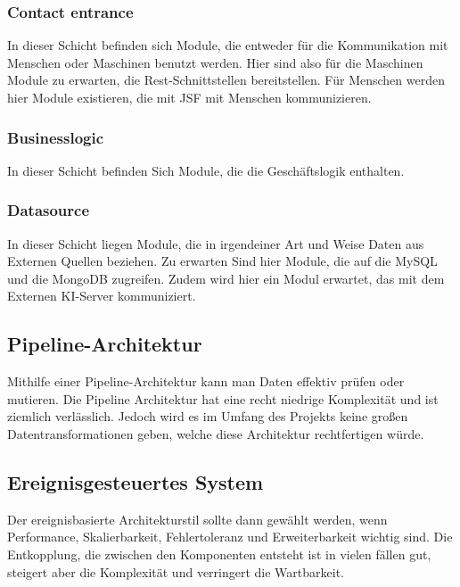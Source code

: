 \vspace{12pt}

\subsubsection{Contact entrance}
In dieser Schicht befinden sich Module, die entweder für die Kommunikation mit Menschen oder Maschinen benutzt werden. Hier sind also für die Maschinen Module zu erwarten, die Rest-Schnittstellen bereitstellen. Für Menschen werden hier Module existieren, die mit JSF mit Menschen kommunizieren. 

\vspace{12pt}

\subsubsection{Businesslogic}
In dieser Schicht befinden Sich Module, die die Geschäftslogik enthalten. 

\vspace{12pt}

\subsubsection{Datasource}
In dieser Schicht liegen Module, die in irgendeiner Art und Weise Daten aus Externen Quellen beziehen. Zu erwarten Sind hier Module, die auf die MySQL und die MongoDB zugreifen. Zudem wird hier ein Modul erwartet, das mit dem Externen KI-Server kommuniziert. 

\vspace{18pt}

\subsection{Pipeline-Architektur}
Mithilfe einer Pipeline-Architektur kann man Daten effektiv prüfen oder mutieren.  
Die Pipeline Architektur hat eine recht niedrige Komplexität und ist ziemlich verlässlich.  
Jedoch wird es im Umfang des Projekts keine großen Datentransformationen geben, welche diese Architektur rechtfertigen würde.

\vspace{18pt}

\subsection{Ereignisgesteuertes System}
Der ereignisbasierte Architekturstil sollte dann gewählt werden, wenn Performance, Skalierbarkeit, Fehlertoleranz und Erweiterbarkeit wichtig sind. Die Entkopplung, die zwischen den Komponenten entsteht ist in vielen fällen gut, steigert aber die Komplexität und verringert die Wartbarkeit. 

